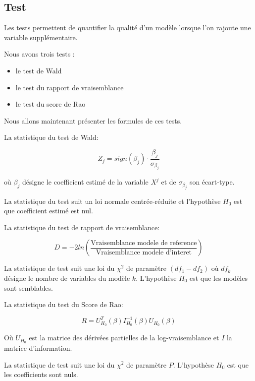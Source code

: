 \documentclass[10pt,french]{report}
\begin{document}
	\subsection{Test}
    
    Les tests permettent de quantifier la qualité d’un modèle lorsque l'on rajoute une variable supplémentaire. 

	Nous avons trois tests : 
	\begin{itemize}
		\item le test de Wald  
		\item le test du rapport de vraisemblance 
		\item le test du score de Rao 
	\end{itemize}
	
	Nous allons maintenant présenter les formules de ces tests.

    La statistique du test de Wald:

	\begin{equation}
		Z_j = sign(\beta_j) \cdot \frac{\beta_j}{\sigma_{\beta_j}}
	\end{equation}
	
	où $\beta_j$ désigne le coefficient estimé de la variable $X^j$ et de $\sigma_{\beta_j}$ son écart-type.

	La statistique du test suit un loi normale centrée-réduite et l’hypothèse $H_0$ est que coefficient estimé est nul.

    La statistique du test de rapport de vraisemblance:

	\begin{equation}
	D = -2 ln (\frac{\mbox{Vraisemblance modele de reference}}{\mbox{Vraisemblance modele d'interet}})
	\end{equation}

	La statistique de test suit une loi du $\chi^2$ de paramètre $(df_1 - df_2)$ où $df_k$ désigne le nombre de variables du modèle $k$. L’hypothèse $H_0$ est que les modèles sont semblables.

    La statistique du test du Score de Rao:

	\begin{equation}
	R = U_{H_0} ^T (\beta) I_{H_0} ^{-1} (\beta) U_{H_0} (\beta)
	\end{equation}

	Où $U_{H_0}$ est la matrice des dérivées partielles de la log-vraisemblance et $I$ la matrice d’information.

	La statistique de test suit une loi du $\chi ^2$ de paramètre $P$. L’hypothèse $H_0$ est que les coefficients sont nuls.
    
\end{document}
